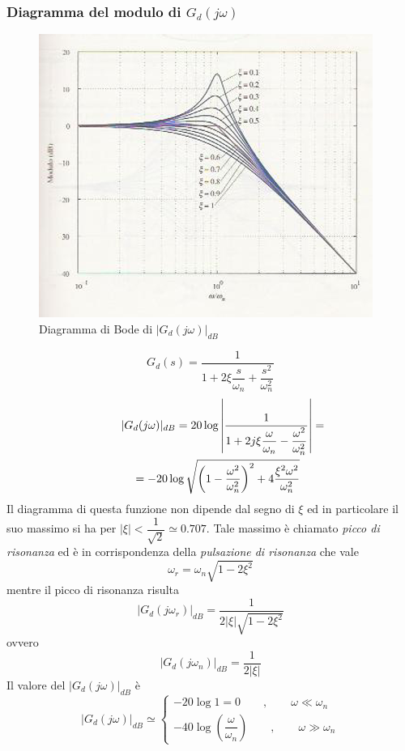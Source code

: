 \documentclass[a4paper]{report}
\begin{document}
\subsubsection{Diagramma del modulo di $G_d{(j\omega)}$}
\begin{figure}[!b]
  \begin{center}
    \includegraphics[scale=0.5]{./figures/diagmod4.png}
    \caption{Diagramma di Bode di $|G_d(j\omega)|_{dB}$}
    \label{fig:bode4}
  \end{center}
\end{figure}
\[
  G_d(s)=\dfrac{1}{1+2\xi \dfrac{s}{\omega_n} + \dfrac{s^2}{\omega_n^2}}
\]
\begin{eqnarray*}
  \lefteqn{|G_d(j\omega)|_{dB}=20\log \left| \dfrac{1}{1 +
      2j\xi\dfrac{\omega}{\omega_n} -
      \dfrac{\omega^2}{\omega_n^2}}\right| = {} } \\
  & & {}=-20\log\sqrt{\left(1 - \dfrac{\omega^2}{\omega_n^2}\right)^2
    + 4\dfrac{\xi^2\omega^2}{\omega_n^2}}
\end{eqnarray*}
Il diagramma di questa funzione non dipende dal segno di $\xi$ ed in
particolare il suo massimo si ha per $|\xi| < \dfrac{1}{\sqrt{2}}
\simeq 0.707$. Tale massimo \`e chiamato \emph{picco di
  risonanza} ed \`e in corrispondenza della
\emph{pulsazione di risonanza} che
vale
\begin{equation}\label{eq:pulsrison}
  \omega_r=\omega_n\sqrt{1-2\xi^2}
\end{equation}
mentre il picco di risonanza risulta
\begin{equation}\label{eq:piccodirison}
  |G_d(j\omega_r)|_{dB} = \dfrac{1}{2|\xi|\sqrt{1-2\xi^2}}
\end{equation}
ovvero
\begin{equation}
  |G_d(j\omega_n)|_{dB} = \dfrac{1}{2|\xi|}
\end{equation}
Il valore del $|G_d(j\omega)|_{dB}$ \`e
\begin{displaymath}
  |G_d(j\omega)|_{dB}\simeq \left\{ 
  \begin{array}{l}
    -20\log 1 = 0\qquad,\qquad \omega \ll \omega_n\\ 
    -40\log \left( \dfrac{\omega}{\omega_n}\right) \qquad , \qquad \omega \gg  \omega_n
  \end{array}
  \right.
\end{displaymath}
\end{document}
